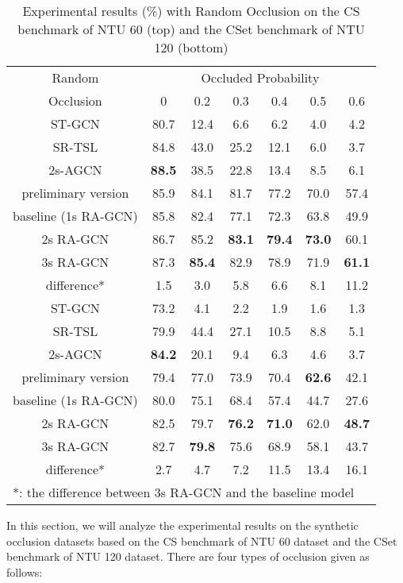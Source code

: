 \documentclass[journal]{IEEEtran}
\begin{document}
\begin{table}[t]
\caption{Experimental results (\%) with Random Occlusion on the CS benchmark of NTU 60 (top) and the CSet benchmark of NTU 120 (bottom)}
\label{tab:random}
\centering
\begin{tabular}{ccccccc}
\hline
Random & \multicolumn{6}{c}{Occluded Probability} \\
\cline{2-7}
Occlusion & 0 & 0.2 & 0.3 & 0.4 & 0.5 & 0.6 \\
\hline
\hline
ST-GCN \cite{yan2018spatial} & 80.7 & 12.4 & 6.6 & 6.2 & 4.0 & 4.2 \\
SR-TSL \cite{si2018skeleton} & 84.8 & 43.0 & 25.2 & 12.1 & 6.0 & 3.7 \\
2s-AGCN \cite{shi2019two} & {\bf 88.5} & 38.5 & 22.8 & 13.4 & 8.5 & 6.1 \\
preliminary version \cite{song2019richly} & 85.9 & 84.1 & 81.7 & 77.2 & 70.0 & 57.4 \\
baseline (1s RA-GCN) & 85.8 & 82.4 & 77.1 & 72.3 & 63.8 & 49.9 \\
2s RA-GCN & 86.7 & 85.2 & {\bf 83.1} & {\bf 79.4} & {\bf 73.0} & 60.1 \\
3s RA-GCN & 87.3 & {\bf 85.4} & 82.9 & 78.9 & 71.9 & {\bf 61.1} \\
difference* & 1.5 & 3.0 & 5.8 & 6.6 & 8.1 & 11.2 \\
\hline
\hline
ST-GCN \cite{yan2018spatial} & 73.2 & 4.1 & 2.2 & 1.9 & 1.6 & 1.3 \\
SR-TSL \cite{si2018skeleton} & 79.9 & 44.4 & 27.1 & 10.5 & 8.8 & 5.1 \\
2s-AGCN \cite{shi2019two} & {\bf 84.2} & 20.1 & 9.4 & 6.3 & 4.6 & 3.7 \\
preliminary version \cite{song2019richly} & 79.4 & 77.0 & 73.9 & 70.4 & {\bf 62.6} & 42.1 \\
baseline (1s RA-GCN) & 80.0 & 75.1 & 68.4 & 57.4 & 44.7 & 27.6 \\
2s RA-GCN & 82.5 & 79.7 & {\bf 76.2} & {\bf 71.0} & 62.0 & {\bf 48.7} \\
3s RA-GCN & 82.7 & {\bf 79.8} & 75.6 & 68.9 & 58.1 & 43.7 \\
difference* & 2.7 & 4.7 & 7.2 & 11.5 & 13.4 & 16.1 \\
\hline
\multicolumn{7}{l}{*: the difference between 3s RA-GCN and the baseline model}
\end{tabular}
\vspace{-0.4cm}
\end{table}

In this section, we will analyze the experimental results on the synthetic occlusion datasets based on the CS benchmark of NTU 60 dataset and the CSet benchmark of NTU 120 dataset. There are four types of occlusion given as follows:
\end{document}
